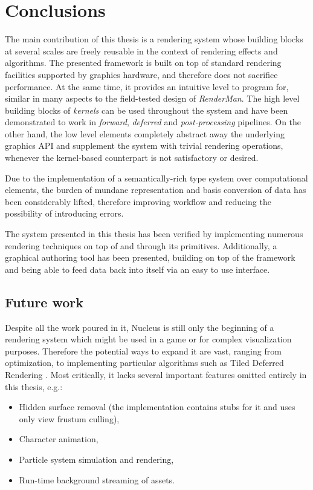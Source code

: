 
\chapter{ Conclusions }
\label{Chapter7}

The main contribution of this thesis is a rendering system whose building blocks at several scales are freely reusable in the context of rendering effects and algorithms. The presented framework is built on top of standard rendering facilities supported by graphics hardware, and therefore does not sacrifice performance. At the same time, it provides an intuitive level to program for, similar in many aspects to the field-tested design of \emph{RenderMan}. The high level building blocks of \emph{kernels} can be used throughout the system and have been demonstrated to work in \emph{forward}, \emph{deferred} and \emph{post-processing} pipelines. On the other hand, the low level elements completely abstract away the underlying graphics API and supplement the system with trivial rendering operations, whenever the kernel-based counterpart is not satisfactory or desired.

Due to the implementation of a semantically-rich type system over computational elements, the burden of mundane representation and basis conversion of data has been considerably lifted, therefore improving workflow and reducing the possibility of introducing errors.

The system presented in this thesis has been verified by implementing numerous rendering techniques on top of and through its primitives. Additionally, a graphical authoring tool has been presented, building on top of the framework and being able to feed data back into itself via an easy to use interface.

\section{Future work}

Despite all the work poured in it, Nucleus is still only the beginning of a rendering system which might be used in a game or for complex visualization purposes. Therefore the potential ways to expand it are vast, ranging from optimization, to implementing particular algorithms such as Tiled Deferred Rendering \cite{tiledDeferred}. Most critically, it lacks several important features omitted entirely in this thesis, e.g.:
\begin{itemize}
\item Hidden surface removal (the implementation contains stubs for it and uses only view frustum culling),
\item Character animation,
\item Particle system simulation and rendering,
\item Run-time background streaming of assets.
\end{itemize}

